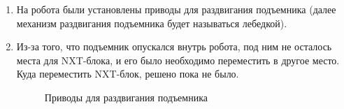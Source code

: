 \begin{enumerate}
\begin{enumerate}
      \item	На робота были установлены приводы для раздвигания подъемника (далее механизм раздвигания подъемника будет называться лебедкой).\newline
      
      \item	Из-за того, что подъемник опускался внутрь робота, под ним не осталось места для NXT-блока, и его было необходимо переместить в другое место. Куда переместить NXT-блок, решено пока не было.\newline
      
      \begin{figure}[H]
      	\begin{minipage}[h]{1\linewidth}
      		\caption{Приводы для раздвигания подъемника}
      	\end{minipage}
      \end{figure}
      

\end{enumerate}
\end{enumerate}
